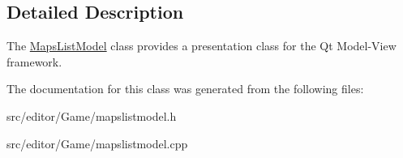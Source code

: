 \subsection{\-Detailed \-Description}
\-The \hyperlink{class_maps_list_model}{\-Maps\-List\-Model} class provides a presentation class for the \-Qt \-Model-\/\-View framework. 

\-The documentation for this class was generated from the following files\-:\begin{DoxyCompactItemize}
\item 
src/editor/\-Game/mapslistmodel.\-h\item 
src/editor/\-Game/mapslistmodel.\-cpp\end{DoxyCompactItemize}
